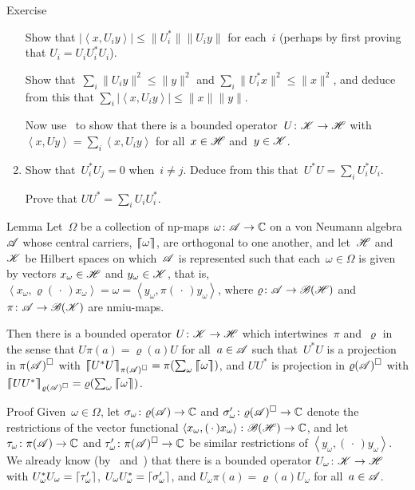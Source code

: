 \documentclass[a]{subfiles}
\begin{document}
\begin{parsec}
\begin{point}{Exercise}
\begin{point}
\begin{enumerate}
Show that
$\left|\left<x,U_iy\right>\right|
\leq \|U_i^*\| \|U_i y \|$
for each~$i$
(perhaps by first proving that  $U_i = U_i U_i^* U_i$).

Show that~$\sum_i \|U_i y\|^2 \leq \|y\|^2$
and $\sum_i \|U_i^* x\|^2\leq \|x\|^2$,
and deduce from this
that $\sum_i \left|\left<x,U_i y\right>\right| \leq \|x\|\|y\|$.

Now use~
to show that there is a bounded operator~$U\colon \mathscr{K}\to\mathscr{H}$
with $\left<x,Uy\right>
= \sum_i \left<x,U_iy\right>$
for all~$x\in\mathscr{H}$ and~$y\in \mathscr{K}$.
\item
Show that~$U_i^*U_j = 0$ when~$i\neq j$.
Deduce from this that~$U^*U = \sum_i U_i^* U_i$.

Prove that $UU^* = \sum_i U_iU_i^*$.
\end{enumerate}
\end{point}
\end{point}
\begin{point}{Lemma}%
Let~$\Omega$ be a collection of np-maps $\omega\colon \mathscr{A}\to\mathbb{C}$
on a von Neumann algebra~$\mathscr{A}$ 
whose central carriers,  $\left\lceil\!\!\left\lceil\omega\right\rceil\!\!\right\rceil$, are orthogonal to one another,
and let~$\mathscr{H}$ and~$\mathscr{K}$ be Hilbert spaces
on which~$\mathscr{A}$ is represented such
that each~$\omega\in\Omega$ 
is given by vectors $x_\omega\in\mathscr{H}$ and $y_\omega\in\mathscr{K}$,
that is,
$\left<x_\omega,\varrho(\,\cdot\,)x_\omega\right>
=\omega = \left<y_\omega,\pi(\,\cdot\,)y_\omega\right>$,
where $\varrho\colon \mathscr{A}\to\mathscr{B}(\mathscr{H})$
and $\pi\colon \mathscr{A}\to\mathscr{B}(\mathscr{K})$
are nmiu-maps.

Then there is a bounded operator $U\colon \mathscr{K}\to\mathscr{H}$
which intertwines~$\pi$ and~$\varrho$
in the sense that $U \pi(a)=\varrho(a) U$
for all~$a\in \mathscr{A}$
such that~$U^*U$
is a projection in
$\pi(\mathscr{A})^\square$
with
$\cceil{U^*U}_{\pi(\scrA)^\square}=\pi(\sum_\omega \cceil{\omega})$,
and 
$UU^*$
is projection in
$\varrho(\mathscr{A})^\square$
with
$\cceil{UU^*}_{\varrho(\scrA)^\square}=\varrho(\sum_\omega \cceil{\omega})$.
\begin{point}{Proof}%
Given~$\omega\in\Omega$,
let $\sigma_\omega\colon \varrho(\mathscr{A})\to \mathbb{C}$
and $\sigma_\omega'\colon \varrho(\mathscr{A})^\square\to\mathbb{C}$
denote the restrictions
of the vector functional $\left<x_\omega,(\,\cdot\,)x_\omega\right>
\colon \mathscr{B}(\mathscr{H})\to\mathbb{C}$,
and let  $\tau_\omega\colon \pi(\mathscr{A})\to \mathbb{C}$
and $\tau_\omega'\colon \pi(\mathscr{A})^\square\to\mathbb{C}$
be similar restrictions
of $\left<y_\omega,(\,\cdot\,)y_\omega\right>$.
We already know (by~
and~)
that
there is
a bounded operator $U_\omega\colon \mathscr{K}\to\mathscr{H}$
with $U_\omega^*U_\omega = \left\lceil\tau_\omega'\right\rceil$,
$U_\omega U_\omega^* = \left\lceil\sigma_\omega'\right\rceil$,
and $U_\omega \pi(a) = \varrho(a) U_\omega$
for all~$a\in\mathscr{A}$.


\end{point}
\end{point}
\end{parsec}
\end{document}
